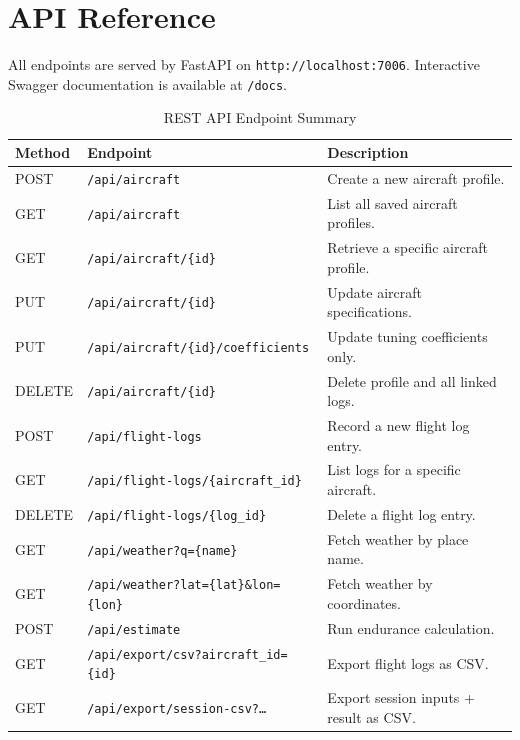 \documentclass[11pt,a4paper]{article}
\begin{document}
\newpage

\section{API Reference}

All endpoints are served by FastAPI on \texttt{http://localhost:7006}. Interactive Swagger documentation is available at \texttt{/docs}.

\begin{table}[H]
    \centering
    \renewcommand{\arraystretch}{1.4}
    \begin{tabularx}{\textwidth}{@{}llX@{}}
        \toprule
        \textbf{Method} & \textbf{Endpoint} & \textbf{Description} \\
        \midrule
        POST & \texttt{/api/aircraft} & Create a new aircraft profile. \\
        GET & \texttt{/api/aircraft} & List all saved aircraft profiles. \\
        GET & \texttt{/api/aircraft/\{id\}} & Retrieve a specific aircraft profile. \\
        PUT & \texttt{/api/aircraft/\{id\}} & Update aircraft specifications. \\
        PUT & \texttt{/api/aircraft/\{id\}/coefficients} & Update tuning coefficients only. \\
        DELETE & \texttt{/api/aircraft/\{id\}} & Delete profile and all linked logs. \\
        \midrule
        POST & \texttt{/api/flight-logs} & Record a new flight log entry. \\
        GET & \texttt{/api/flight-logs/\{aircraft\_id\}} & List logs for a specific aircraft. \\
        DELETE & \texttt{/api/flight-logs/\{log\_id\}} & Delete a flight log entry. \\
        \midrule
        GET & \texttt{/api/weather?q=\{name\}} & Fetch weather by place name. \\
        GET & \texttt{/api/weather?lat=\{lat\}\&lon=\{lon\}} & Fetch weather by coordinates. \\
        \midrule
        POST & \texttt{/api/estimate} & Run endurance calculation. \\
        GET & \texttt{/api/export/csv?aircraft\_id=\{id\}} & Export flight logs as CSV. \\
        GET & \texttt{/api/export/session-csv?\ldots} & Export session inputs + result as CSV. \\
        \bottomrule
    \end{tabularx}
    \caption{REST API Endpoint Summary}
\end{table}
\end{document}
